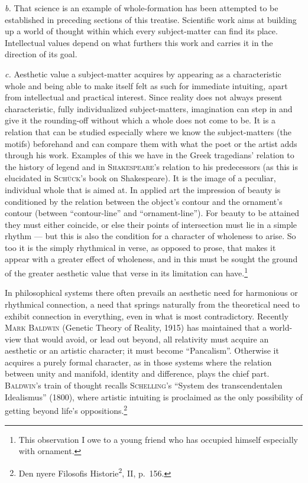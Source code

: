 \documentclass[12pt]{book}
\newcommand{\opage}[1]{\marginnote{\footnotesize\textit{[#1]}}}
\begin{document}
\textit{b.} That science is an example of whole-formation has been attempted to be
established in preceding sections of this treatise. Scientific work aims at \opage{69}building up
a world of thought within which every subject-matter can find its place. Intellectual
values depend on what furthers this work and carries it in the direction of its goal.

\textit{c.} Aesthetic value a subject-matter acquires by appearing as a characteristic
whole and being able to make itself felt as such for immediate intuiting, apart from
intellectual and practical interest. Since reality does not always present
characteristic, fully individualized subject-matters, imagination can step in and give
it the rounding-off without which a whole does not come to be. It is a relation that
can be studied especially where we know the subject-matters (the motifs) beforehand and
can compare them with what the poet or the artist adds through his work. Examples of
this we have in the Greek tragedians' relation to the history of legend and in
\textsc{Shakespeare}'s relation to his predecessors (as this is elucidated in
\textsc{Schück}'s book on Shakespeare). It is the image of a peculiar, individual whole
that is aimed at. In applied art the impression of beauty is conditioned by the relation
between the object's contour and the ornament's contour (between ``contour-line'' and
``ornament-line''). For beauty to be attained they must either coincide, or else their
points of intersection must lie in a simple rhythm --- but this is also the condition
for a character of wholeness to arise. So too it is the simply rhythmical in verse, as
opposed to prose, that makes it appear with a greater effect of wholeness, and in this
must be sought the ground of the greater aesthetic value that verse in its limitation
can have.\footnote{This observation I owe to a young friend who has occupied himself
especially with ornament.}

In philosophical systems there often prevails an aesthetic need for harmonious or
rhythmical connection, a need that springs naturally from the theoretical need to
exhibit connection in everything, even in what is most contradictory. Recently
\textsc{Mark Baldwin} (Genetic Theory of Reality, 1915) has maintained that a world-view
that would avoid, or lead out beyond, all relativity must acquire an aesthetic or an
artistic character; it must become ``Pancalism''. Otherwise it acquires a purely formal
character, as in those systems where the relation between unity and manifold, identity
and difference, plays the chief part. \textsc{Baldwin}'s train of thought recalls
\textsc{Schelling}'s ``System des transcendentalen Idealismus'' (1800), where artistic
intuiting is proclaimed as the only possibility of getting beyond life's
oppositions.\footnote{Den nyere Filosofis Historie\textsuperscript{2}, II, p.\ 156.}
\end{document}
